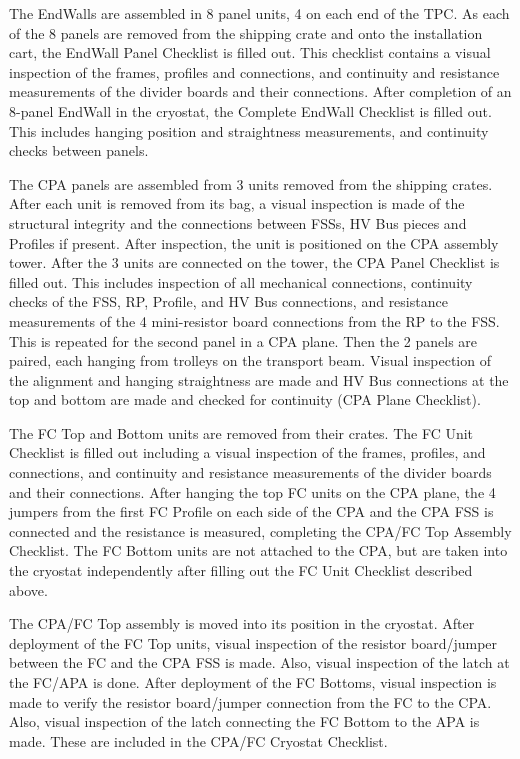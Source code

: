 The EndWalls are assembled in 8  panel units, 4 on each end of the TPC.  
As each of the 8 panels are removed from the shipping crate and onto the installation cart, the EndWall Panel Checklist is filled out.\cite{bib:docdb10452}
This checklist contains a visual inspection of the frames, profiles and connections, and continuity and resistance measurements of the divider boards and their connections.  
After completion of an 8-panel EndWall in the cryostat, the Complete EndWall Checklist is filled out.  
This includes hanging position and straightness measurements, and continuity checks between panels.

The CPA panels are assembled from 3 units removed from the shipping crates.  
After each unit is removed from its bag, a visual inspection is made of the structural integrity and the connections between FSSs, HV Bus pieces and Profiles if present.  
After inspection, the unit is positioned on the CPA assembly tower.  
After the 3 units are connected on the tower, the CPA Panel Checklist is filled out.  
This includes inspection of all mechanical connections, continuity checks of the FSS, RP, Profile, and HV Bus connections, and resistance measurements of the 4 mini-resistor board connections from the RP to the FSS.  
This is repeated for the second panel in a CPA plane.  Then the 2 panels are paired, each hanging from trolleys on the transport beam.  
Visual inspection of the alignment and hanging straightness are made and HV Bus connections at the top and bottom are made and checked for continuity (CPA Plane Checklist).

The FC Top and Bottom units are removed from their crates.  The FC Unit Checklist is filled out including a visual inspection of the frames, profiles, and connections, and continuity and resistance measurements of the divider boards and their connections.  
After hanging the top FC units on the CPA plane, the 4 jumpers from the first FC Profile on each side of the CPA and the CPA FSS is connected and the resistance is measured, completing the CPA/FC Top Assembly Checklist. 
The FC Bottom units are not attached to the CPA, but are taken into the cryostat independently after filling out the FC Unit Checklist described above.

The CPA/FC Top assembly is moved into its position in the cryostat.   
After deployment of the FC Top units, visual inspection of the resistor board/jumper between the FC and the CPA FSS is made.  
Also, visual inspection of the latch at the FC/APA is done.  After deployment of the FC Bottoms, visual inspection is made to verify the resistor board/jumper connection from the FC to the CPA.  
Also, visual inspection of the latch connecting the FC Bottom to the APA is made.  
These are included in the CPA/FC Cryostat Checklist.

